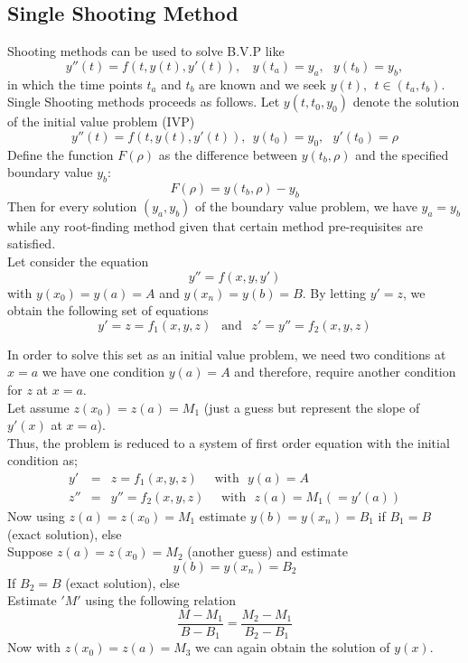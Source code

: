 \documentclass[12pt]{report}
\newcommand{\sps}{\\[0.2cm]}
\newcommand{\NI}{\noindent}
\newcommand{\sprime}{'}
\newcommand{\dprime}{''}
\begin{document}
	\subsection{Single Shooting Method}
	Shooting methods can be used to solve B.V.P like
	\begin{equation}
		y\dprime(t) = f(t, y(t), y\sprime(t)) , ~~~~ y(t_a) = y_a, ~~~ y(t_b) = y_b,
	\end{equation}
	in which the time points $t_a$ and $t_b$ are known and we seek $y(t), ~~t \in (t_a, t_b)$.\sps
	
	\NI Single Shooting methods proceeds as follows. Let $y(t, t_0, y_0)$ denote the solution of the initial value problem (IVP)
	\begin{equation}
		y\dprime(t) = f(t, y(t), y\sprime(t)), ~~ y(t_0) = y_0, ~~~ y\sprime(t_0) = \rho 
	\end{equation}
	Define the function $F(\rho)$ as the difference between $y(t_b, \rho)$ and the specified boundary value $y_b$:
	\begin{equation}
		F(\rho) = y(t_b, \rho) - y_b
	\end{equation}
	Then for every solution $(y_a, y_b)$ of the boundary value problem, we have $y_a=y_b$ while any root-finding method given that certain method pre-requisites are satisfied.\sps
	
	\NI Let consider the equation
	\begin{equation}
		y\dprime = f(x,y, y\sprime)
	\end{equation}
	with $y(x_0) = y(a) = A$ and $y(x_n) = y(b) = B$. By letting $y\sprime = z$, we obtain the following set of equations
	\begin{equation}
		y\sprime = z = f_1(x,y,z) ~~\text{ and }~~ z\sprime = y\dprime = f_2(x,y,z)
	\end{equation}
	
	\NI In order to solve this set as an initial value problem, we need two conditions at $x=a$ we have one condition $y(a)=A$ and therefore, require another condition for $z$ at $x=a$.\sps
	Let assume $z(x_0) = z(a) = M_1$ (just a guess but represent the slope of $y\sprime(x)$ at $x=a$).\sps
	Thus, the problem is reduced to a system of first order equation with the initial condition as;
	\begin{eqnarray}
		y\sprime &=& z = f_1(x,y,z) ~~~~~~ \text{with}~~~ y(a) = A\sps
		z\dprime &=& y\dprime = f_2(x,y,z) ~~~~~~\text{with}~~~ z(a) = M_1 (= y\sprime(a)) 
	\end{eqnarray}
	Now using $z(a) = z(x_0) = M_1$ estimate $y(b)=y(x_n) = B_1$ if $B_1=B$ (exact solution), else\sps
	Suppose $z(a) = z(x_0) = M_2$ (another guess) and estimate
	\begin{equation}
			y(b) = y(x_n) = B_2
	\end{equation}
	If $B_2 = B$ (exact solution), else\\
	Estimate $'M'$ using the following relation
	\begin{equation}
		\frac{M - M_1}{B - B_1} = \frac{M_2 - M_1}{B_2 - B_1}
	\end{equation}
	Now with $z(x_0) = z(a) = M_3$ we can again obtain the solution of $y(x)$.
	
\end{document}
